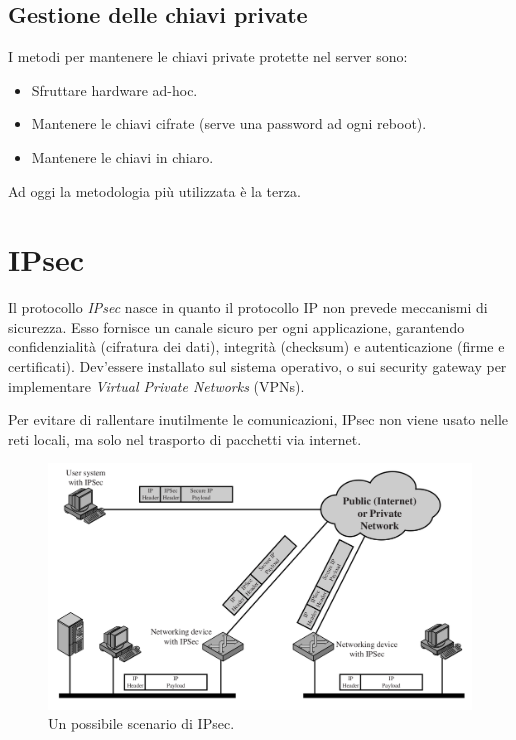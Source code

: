 \documentclass[a4paper, 11pt, twoside, openright, fleqn]{report}
\begin{document}
\subsection{Gestione delle chiavi private}
I metodi per mantenere le chiavi private protette nel server sono:
\begin{itemize}
	\item Sfruttare hardware ad-hoc.
	\item Mantenere le chiavi cifrate (serve una password ad ogni reboot).
	\item Mantenere le chiavi in chiaro.
\end{itemize}
Ad oggi la metodologia più utilizzata è la terza.

\section{IPsec}
Il protocollo \emph{IPsec} nasce in quanto il protocollo IP non prevede meccanismi di sicurezza. Esso fornisce un canale sicuro per ogni applicazione, garantendo confidenzialità (cifratura dei dati), integrità (checksum) e autenticazione (firme e certificati). Dev'essere installato sul sistema operativo, o sui security gateway per implementare \emph{Virtual Private Networks} (VPNs).

Per evitare di rallentare inutilmente le comunicazioni, IPsec non viene usato nelle reti locali, ma solo nel trasporto di pacchetti via internet.
\begin{figure}[htp]
	\centering
	\includegraphics[width=\textwidth]{images/IPsecScenario}
	\caption{Un possibile scenario di IPsec.}
\end{figure}
\end{document}
